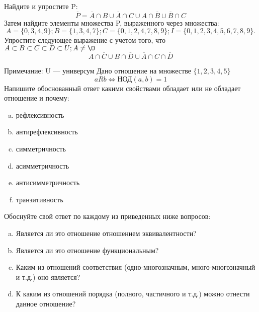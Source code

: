 \documentclass[10pt]{exam}
\begin{document}
\begin{questions}
\question
Найдите и упростите P:
\begin{equation*}
\overline{P} = \overline{A} \cap B \cup \overline{A} \cap C \cup A \cap \overline{B} \cup \overline{B} \cap C
\end{equation*}
Затем найдите элементы множества P, выраженного через множества:
\begin{equation*}
A = \{0, 3, 4, 9\}; 
B = \{1, 3, 4, 7\};
C = \{0, 1, 2, 4, 7, 8, 9\};
I = \{0, 1, 2, 3, 4, 5, 6, 7, 8, 9\}.
\end{equation*}\question
Упростите следующее выражение с учетом того, что $A\subset B \subset C \subset D \subset U; A \neq \O$
\begin{equation*}
A \cap  \overline{C} \cup B \cap \overline{D} \cup  \overline{A} \cap C \cap  \overline{D}
\end{equation*}

Примечание: U — универсум\question
Дано отношение на множестве $\{1, 2, 3, 4, 5\}$ 
\begin{equation*}
aRb \iff  \text{НОД}(a,b) =1
\end{equation*}
Напишите обоснованный ответ какими свойствами обладает или не обладает отношение и почему:   
\begin{enumerate} [a)]\setcounter{enumi}{0}
\item рефлексивность
\item антирефлексивность
\item симметричность
\item асимметричность
\item антисимметричность
\item транзитивность
\end{enumerate}

Обоснуйте свой ответ по каждому из приведенных ниже вопросов:
\begin{enumerate} [a)]\setcounter{enumi}{0}
    \item Является ли это отношение отношением эквивалентности?
    \item Является ли это отношение функциональным?
    \item Каким из отношений соответствия (одно-многозначным, много-многозначный и т.д.) оно является?
    \item К каким из отношений порядка (полного, частичного и т.д.) можно отнести данное отношение?
\end{enumerate}



\end{questions}
\end{document}
